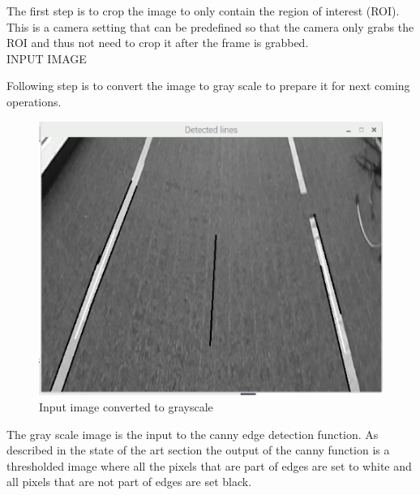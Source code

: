 The first step is to crop the image to only contain the region of interest (ROI). This is a camera setting that can be predefined so that the camera only grabs the ROI and thus not need to crop it after the frame is grabbed.\\

INPUT IMAGE


Following step is to convert the image to gray scale to prepare it for next coming operations. 



\begin{figure}[H]
  \includegraphics[width=\textwidth]{./img/gray.png}
  \centering
  \caption{Input image converted to grayscale}
  \label{fig:Input image converted to grayscale}
\end{figure}


The gray scale image is the input to the canny edge detection function. As described in the state of the art section the output of the canny function is a thresholded image where all the pixels that are part of edges are set to white and all pixels that are not part of edges are set black.

